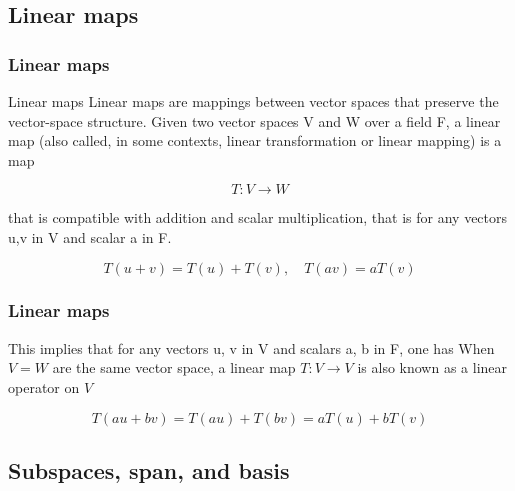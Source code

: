 \documentclass{beamer}
\begin{document}
    \subsection{Linear maps}

    \begin{frame}
        \frametitle{Linear maps}



        \begin{block}{Linear maps}
            Linear maps are mappings between vector spaces that preserve the vector-space structure. Given two vector
            spaces V and W over a field F, a linear map (also called, in some contexts, linear transformation or linear mapping)
            is a map

        \end{block}
        \pause

        \begin{alertblock}{}
            $$T:V\to W$$
        \end{alertblock}
        \pause

        that is compatible with addition and scalar multiplication, that is
        for any vectors u,v in V and scalar a in F.
        \pause

        \begin{alertblock}{}


            $$T(u+v)=T(u)+T(v),\quad T(av)=aT(v)$$

        \end{alertblock}


    \end{frame}


    \begin{frame}
        \frametitle{Linear maps}
        This implies that for any vectors u, v in V and scalars a, b in F, one has
        When $V = W$ are the same vector space, a linear map $T:V\to V$ is also known as a linear operator on $V$
        \pause

        \begin{alertblock}{}
            $$T(au+bv)=T(au)+T(bv)=aT(u)+bT(v)$$

        \end{alertblock}

    \end{frame}

    \subsection{Subspaces, span, and basis}
\end{document}
